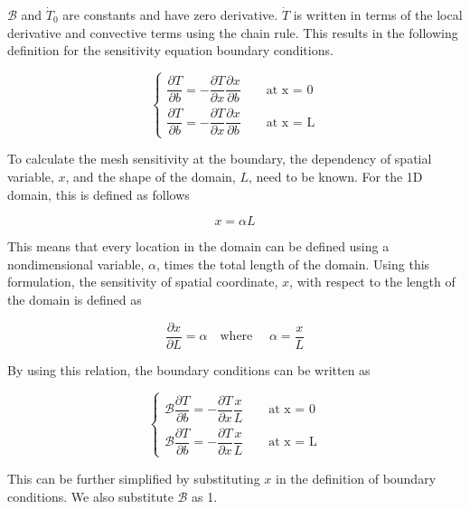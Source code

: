 $\mathcal{B}$ and $\dot{T}_0$ are constants and have zero derivative. $\dot{T}$ is written in terms of the local derivative and convective terms using the chain rule. This results in the following definition for the sensitivity equation boundary conditions.

\begin{equation*}
\begin{cases}
	\dfrac{\partial T}{\partial b} = -\dfrac{\partial T}{\partial x} \dfrac{\partial x}{\partial b} \qquad \text{at x = 0}
	\\
	\dfrac{\partial T}{\partial b} = -\dfrac{\partial T}{\partial x} \dfrac{\partial x}{\partial b} \qquad \text{at x = L}
\end{cases}
\end{equation*}

To calculate the mesh sensitivity at the boundary, the dependency of spatial variable, $x$, and the shape of the domain, $L$, need to be known. For the 1D domain, this is defined as follows

\begin{equation*}
	x = \alpha L
\end{equation*}

This means that every location in the domain can be defined using a nondimensional variable, $\alpha$, times the total length of the domain. Using this formulation, the sensitivity of spatial coordinate, $x$, with respect to the length of the domain is defined as

\begin{equation*}
	\frac{\partial x}{\partial L} = \alpha \quad \text{where } \quad \alpha = \frac{x}{L}
\end{equation*}

By using this relation, the boundary conditions can be written as

\begin{equation*}
\begin{cases}
	\mathcal{B} \dfrac{\partial T}{\partial b} = -\dfrac{\partial T}{\partial x} \dfrac{x}{L} \qquad \text{at x = 0}
	\\
	\mathcal{B} \dfrac{\partial T}{\partial b} = -\dfrac{\partial T}{\partial x} \dfrac{x}{L} \qquad \text{at x = L}
\end{cases}
\end{equation*}

This can be further simplified by substituting $x$ in the definition of boundary conditions. We also substitute $\mathcal{B}$ as 1.

